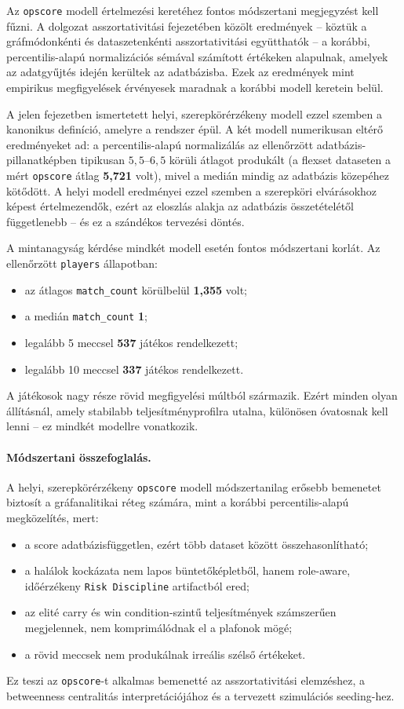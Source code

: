 ﻿\documentclass[a4paper,12pt]{report}
\begin{document}
Az \texttt{opscore} modell értelmezési keretéhez fontos módszertani megjegyzést kell fűzni. A dolgozat asszortativitási fejezetében közölt eredmények -- köztük a gráfmódonkénti és dataszetenkénti asszortativitási együtthatók -- a korábbi, percentilis-alapú normalizációs sémával számított értékeken alapulnak, amelyek az adatgyűjtés idején kerültek az adatbázisba. Ezek az eredmények mint empirikus megfigyelések érvényesek maradnak a korábbi modell keretein belül.

A jelen fejezetben ismertetett helyi, szerepkörérzékeny modell ezzel szemben a kanonikus definíció, amelyre a rendszer épül. A két modell numerikusan eltérő eredményeket ad: a percentilis-alapú normalizálás az ellenőrzött adatbázis-pillanatképben tipikusan $5{,}5$--$6{,}5$ körüli átlagot produkált (a flexset dataseten a mért \texttt{opscore} átlag \textbf{5{,}721} volt), mivel a medián mindig az adatbázis közepéhez kötődött. A helyi modell eredményei ezzel szemben a szerepköri elvárásokhoz képest értelmezendők, ezért az eloszlás alakja az adatbázis összetételétől függetlenebb -- és ez a szándékos tervezési döntés.

A mintanagyság kérdése mindkét modell esetén fontos módszertani korlát. Az ellenőrzött \texttt{players} állapotban:
\begin{itemize}
    \item az átlagos \texttt{match\_count} körülbelül \textbf{1{,}355} volt;
    \item a medián \texttt{match\_count} \textbf{1};
    \item legalább 5 meccsel \textbf{537} játékos rendelkezett;
    \item legalább 10 meccsel \textbf{337} játékos rendelkezett.
\end{itemize}

A játékosok nagy része rövid megfigyelési múltból származik. Ezért minden olyan állításnál, amely stabilabb teljesítményprofilra utalna, különösen óvatosnak kell lenni -- ez mindkét modellre vonatkozik.

\paragraph{Módszertani összefoglalás.}
A helyi, szerepkörérzékeny \texttt{opscore} modell módszertanilag erősebb bemenetet biztosít a gráfanalitikai réteg számára, mint a korábbi percentilis-alapú megközelítés, mert:
\begin{itemize}
    \item a score adatbázisfüggetlen, ezért több dataset között összehasonlítható;
    \item a halálok kockázata nem lapos büntetőképletből, hanem role-aware, időérzékeny \texttt{Risk Discipline} artifactból ered;
    \item az elité carry és win condition-szintű teljesítmények számszerűen megjelennek, nem komprimálódnak el a plafonok mögé;
    \item a rövid meccsek nem produkálnak irreális szélső értékeket.
\end{itemize}
Ez teszi az \texttt{opscore}-t alkalmas bemenetté az asszortativitási elemzéshez, a betweenness centralitás interpretációjához és a tervezett szimulációs seeding-hez.
\end{document}
